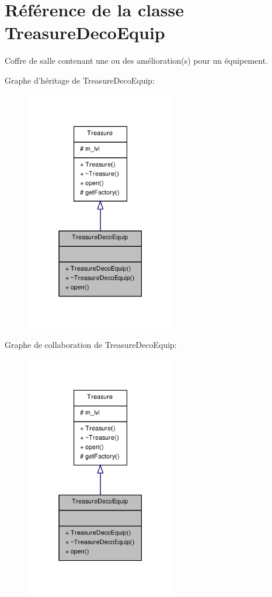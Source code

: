 \hypertarget{class_treasure_deco_equip}{\section{Référence de la classe Treasure\-Deco\-Equip}
\label{class_treasure_deco_equip}
}


Coffre de salle contenant une ou des amélioration(s) pour un équipement.  




Graphe d'héritage de Treasure\-Deco\-Equip\-:
\nopagebreak
\begin{figure}[H]
\begin{center}
\leavevmode
\includegraphics[width=186pt]{class_treasure_deco_equip__inherit__graph}
\end{center}
\end{figure}


Graphe de collaboration de Treasure\-Deco\-Equip\-:
\nopagebreak
\begin{figure}[H]
\begin{center}
\leavevmode
\includegraphics[width=186pt]{class_treasure_deco_equip__coll__graph}
\end{center}
\end{figure}
